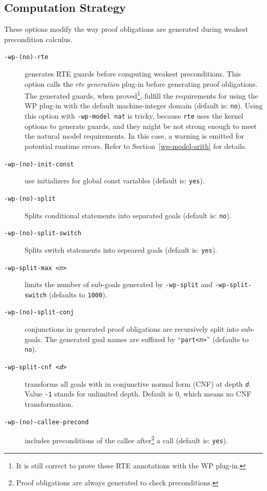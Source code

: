 \subsection{Computation Strategy}
\label{subsec:computation-strategy}

These options modify the way proof obligations are generated during
weakest precondition calculus.

\begin{description}
\item[\tt -wp-(no)-rte] generates RTE guards before computing weakest
  preconditions. This option calls the \emph{rte generation} plug-in
  before generating proof obligations.
  The generated guards, when proved\footnote{It is still correct to prove these RTE
    annotations with the \textsf{WP} plug-in.}, fulfill the requirements for
  using the \textsf{WP} plug-in with the default machine-integer domain (default is: \texttt{no}).
  Using this option with \texttt{-wp-model nat} is tricky, because \texttt{rte} uses the kernel options
  to generate guards, and they might be not strong enough to meet the natural model requirements.
  In this case, a warning is emitted for potential runtime errors.
  Refer to Section~\ref{wp-model-arith} for details.
\item[\tt -wp-(no)-init-const] use initializers for global const variables
  (default is: \texttt{yes}).
\item[\tt -wp-(no)-split] Splits conditional statements into separated goals (default is: \texttt{no}).
\item[\tt -wp-(no)-split-switch] Splits switch statements into sepeared goals (default is: \texttt{yes}).
\item[\tt -wp-split-max <{\it n}>]
  limits the number of sub-goals generated by  \verb|-wp-split| and \verb|-wp-split-switch|
  (defaults to \verb+1000+).
\item[\tt -wp-(no)-split-conj] conjunctions in generated proof obligations are
  recursively split into sub-goals.  The generated goal names are
  suffixed by ``{\tt part<{\it n}>}'' (defaults to \texttt{no}).
\item[\tt -wp-split-cnf <{\it d}>] transforms all goals with in conjunctive normal form (CNF) at depth {\tt\it d}.
  Value \verb|-1| stands for unlimited depth. Default is 0, which means no CNF transformation.
\item[\tt -wp-(no)-callee-precond] includes preconditions of the callee
  after\footnote{Proof obligations are always generated to check preconditions.}
  a call (default is: \texttt{yes}).

\end{description}
